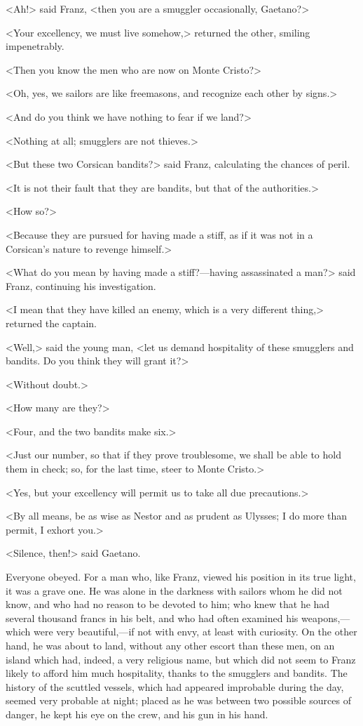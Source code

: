  <Ah!> said Franz, <then you are a smuggler occasionally, Gaetano?> 

 <Your excellency, we must live somehow,> returned the other, smiling impenetrably. 

 <Then you know the men who are now on Monte Cristo?> 

 <Oh, yes, we sailors are like freemasons, and recognize each other by signs.> 

 <And do you think we have nothing to fear if we land?> 

 <Nothing at all; smugglers are not thieves.> 

 <But these two Corsican bandits?> said Franz, calculating the chances of peril. 

 <It is not their fault that they are bandits, but that of the authorities.> 

 <How so?> 

 <Because they are pursued for having made a stiff, as if it was not in a Corsican's nature to revenge himself.> 

 <What do you mean by having made a stiff?—having assassinated a man?> said Franz, continuing his investigation. 

 <I mean that they have killed an enemy, which is a very different thing,> returned the captain. 

 <Well,> said the young man, <let us demand hospitality of these smugglers and bandits. Do you think they will grant it?> 

 <Without doubt.> 

 <How many are they?> 

 <Four, and the two bandits make six.> 

 <Just our number, so that if they prove troublesome, we shall be able to hold them in check; so, for the last time, steer to Monte Cristo.> 

 <Yes, but your excellency will permit us to take all due precautions.> 

 <By all means, be as wise as Nestor and as prudent as Ulysses; I do more than permit, I exhort you.> 

 <Silence, then!> said Gaetano. 

 Everyone obeyed. For a man who, like Franz, viewed his position in its true light, it was a grave one. He was alone in the darkness with sailors whom he did not know, and who had no reason to be devoted to him; who knew that he had several thousand francs in his belt, and who had often examined his weapons,—which were very beautiful,—if not with envy, at least with curiosity. On the other hand, he was about to land, without any other escort than these men, on an island which had, indeed, a very religious name, but which did not seem to Franz likely to afford him much hospitality, thanks to the smugglers and bandits. The history of the scuttled vessels, which had appeared improbable during the day, seemed very probable at night; placed as he was between two possible sources of danger, he kept his eye on the crew, and his gun in his hand. 

